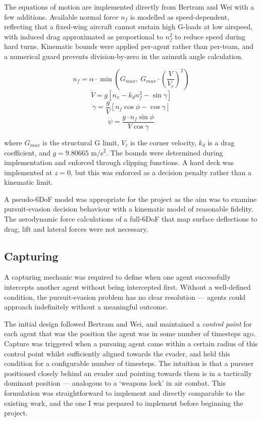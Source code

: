 The equations of motion are implemented directly from Bertram and Wei\cite{bertram3d} with a few additions. Available normal force $n_f$ is modelled as speed-dependent, reflecting that a fixed-wing aircraft cannot sustain high G-loads at low airspeed, with induced drag approximated as proportional to $n_f^2$ to reduce speed during hard turns. Kinematic bounds were applied per-agent rather than per-team, and a numerical guard prevents division-by-zero in the azimuth angle calculation.

\begin{equation}
    n_f = \alpha \cdot \min\left(G_{max},\ G_{max} \cdot \left(\frac{V}{V_c}\right)^2\right)
\end{equation}
\begin{equation}
    \dot{V} = g[n_x - k_d n_f^2 - \sin\gamma]
\end{equation}
\begin{equation}
    \dot{\gamma} = \frac{g}{V}[n_f \cos\phi - \cos\gamma]
\end{equation}
\begin{equation}
    \dot{\psi} = \frac{g \cdot n_f \sin\phi}{V \cos\gamma}
\end{equation}

where $G_{max}$ is the structural G limit, $V_c$ is the corner velocity, $k_d$ is a drag coefficient, and $g = 9.80665$ m/s$^2$. The bounds were determined during implementation and enforced through clipping functions. A hard deck was implemented at $z=0$, but this was enforced as a decision penalty rather than a kinematic limit.

A pseudo-6DoF model was appropriate for the project as the aim was to examine pursuit-evasion decision behaviour with a kinematic model of reasonable fidelity. The aerodynamic force calculations of a full-6DoF that map surface deflections to drag, lift and lateral forces were not necessary.

\subsection{Capturing}
\label{sec:2.3.5}

A capturing mechanic was required to define when one agent successfully intercepts another agent without being intercepted first. Without a well-defined condition, the pursuit-evasion problem has no clear resolution --- agents could approach indefinitely without a meaningful outcome.

The initial design followed Bertram and Wei\cite{bertram3d}, and maintained a \textit{control point} for each agent that was the position the agent was in some number of timesteps ago. Capture was triggered when a pursuing agent came within a certain radius of this control point whilst sufficiently aligned towards the evader, and held this condition for a configurable number of timesteps. The intuition is that a pursuer positioned closely behind an evader and pointing towards them is in a tactically dominant position --- analogous to a `weapons lock' in air combat. This formulation was straightforward to implement and directly comparable to the existing work, and the one I was prepared to implement before beginning the project.

